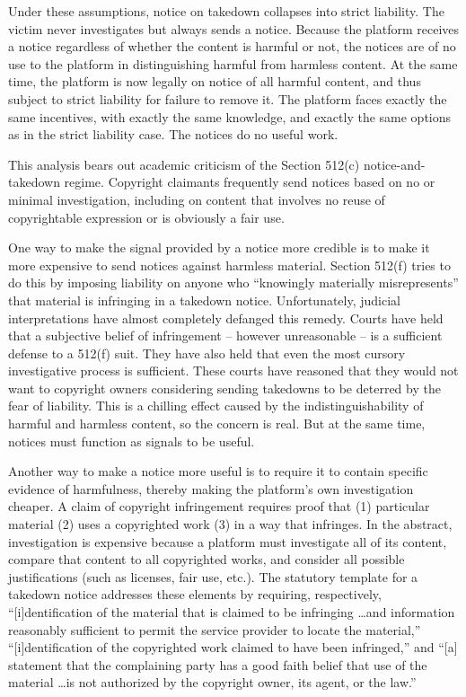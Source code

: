 Under these assumptions, notice on takedown collapses into strict liability. The victim never investigates but always sends a notice. Because the platform receives a notice regardless of whether the content is harmful or not, the notices are of no use to the platform in distinguishing harmful from harmless content. At the same time, the platform is now legally on notice of all harmful content, and thus subject to strict liability for failure to remove it. The platform faces exactly the same incentives, with exactly the same knowledge, and exactly the same options as in the strict liability case. The notices do no useful work.

This analysis bears out academic criticism of the Section 512(c) notice-and-takedown regime. Copyright claimants frequently send notices based on no or minimal investigation, including on content that involves no reuse of copyrightable expression or is obviously a fair use.

One way to make the signal provided by a notice more credible is to make it more expensive to send notices against harmless material. Section 512(f) tries to do this by imposing liability on anyone who ``knowingly materially misrepresents'' that material is infringing in a takedown notice. Unfortunately, judicial interpretations have almost completely defanged this remedy. Courts have held that a subjective belief of infringement -- however unreasonable -- is a sufficient defense to a 512(f) suit. They have also held that even the most cursory investigative process is sufficient. These courts have reasoned that they would not want to copyright owners considering sending takedowns to be deterred by the fear of liability. This is a chilling effect caused by the indistinguishability of harmful and harmless content, so the concern is real. But at the same time, notices must function as signals to be useful.

Another way to make a notice more useful is to require it to contain specific evidence of harmfulness, thereby making the platform's own investigation cheaper. A claim of copyright infringement requires proof that (1) particular material (2) uses a copyrighted work (3) in a way that infringes. In the abstract, investigation is expensive because a platform must investigate all of its content, compare that content to all copyrighted works, and consider all possible justifications (such as licenses, fair use, etc.).  The statutory template for a takedown notice addresses these elements by requiring, respectively, ``[i]dentification of the material that is claimed to be infringing \ldots and information reasonably sufficient to permit the service provider to locate the material,'' ``[i]dentification of the copyrighted work claimed to have been infringed,'' and ``[a] statement that the complaining party has a good faith belief that use of the material \ldots  is not authorized by the copyright owner, its agent, or the law.''

